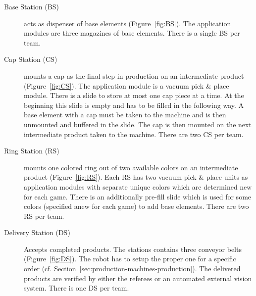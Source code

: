 \documentclass[12pt,twoside]{article}
\newcommand{\refsec}[1]{Section~\ref{#1}}
\newcommand{\reffig}[1]{Figure~\ref{#1}}
\begin{document}
\begin{description}
\item[Base Station (BS)] acts as dispenser of base elements
  (\reffig{fig:BS}). The application modules are three magazines of
  base elements. There is a single BS per team.

\item[Cap Station (CS)] mounts a cap as the final step in production
  on an intermediate product (\reffig{fig:CS}). The application module
  is a vacuum pick \& place module. There is a slide to store at most
  one cap piece at a time. At the beginning this slide is empty and
  has to be filled in the following way.  A base element with a cap
  must be taken to the machine and is then unmounted and buffered in
  the slide. The cap is then mounted on the next intermediate product
  taken to the machine. There are two CS per team.

\item[Ring Station (RS)] mounts one colored ring out of two available
  colors on an intermediate product (\reffig{fig:RS}). Each RS has two
  vacuum pick \& place units as application modules with separate
  unique colors which are determined new for each game. There is an
  additionally pre-fill slide which is used for some colors (specified
  anew for each game) to add base elements. There are two RS per team.

\item[Delivery Station (DS)] Accepts completed products. The stations
  contains three conveyor belts (\reffig{fig:DS}). The robot has to
  setup the proper one for a specific order
  (cf. \refsec{sec:production-machines-production}). The delivered
  products are verified by either the referees or an automated
  external vision system. There is one DS per team.
\end{description}
\end{document}
